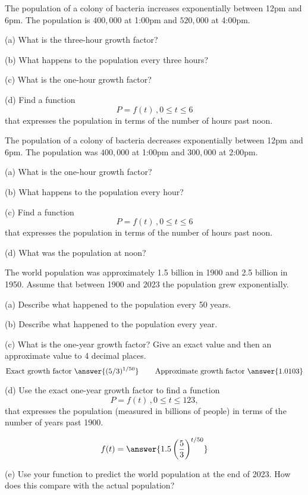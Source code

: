 \documentclass{ximera}
\begin{document}
\begin{question}   \label{Q5:ExponentialG}
The population of a colony of bacteria increases exponentially between 12pm and 6pm. The population is $400,000$ at 1:00pm and $520,000$ at 4:00pm. 

(a) What is the three-hour growth factor?

(b) What happens to the population every three hours?

(c) What is the one-hour growth factor?

(d) Find a function 
\[
     P = f(t) \, , 0\leq t \leq 6 
\]
that expresses the population in terms of the number of hours past noon.

\end{question}



\begin{question}   \label{Q5:ExdsfderdflG}
The population of a colony of bacteria decreases exponentially between 12pm and 6pm. The population was $400,000$ at 1:00pm and $300,000$ at 2:00pm. 

(a) What is the one-hour growth factor?

(b) What happens to the population every hour?

(c) Find a function 
\[
     P = f(t) \, , 0\leq t \leq 6 
\]
that expresses the population in terms of the number of hours past noon.

(d) What was the population at noon?

\end{question}



\begin{question}   \label{Q6:ExponentialG}
The world population was approximately 1.5 billion in 1900 and 2.5 billion in 1950. Assume that between 1900 and 2023 the population grew exponentially.

(a) Describe what happened to the population every 50 years.

(b) Describe what happened to the population every year.

(c) What is the one-year growth factor? Give an exact value and then an approximate value to 4 decimal places.
\[
   \text{Exact growth factor }  \answer{(5/3)^{1/50}} \hskip 0.3 in  \text{Approximate growth factor } \answer{1.0103}
\]

(d) Use the exact one-year growth factor to find a function
\[
     P = f(t) \, , 0\leq t \leq 123 ,
\]
that expresses the population (measured in billions of people) in terms of the number of years past 1900.

\[
   f(t) = \answer{1.5 \left(\frac{5}{3}\right)^{t/50}}
\]

(e) Use your function to predict the world population at the end of 2023. How does this compare with the actual population?

\end{question}
\end{document}
